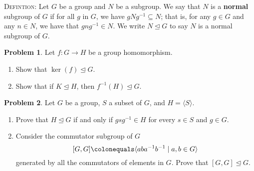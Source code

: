 \documentclass[11pt]{article}
\newcommand{\norm}{\trianglelefteq}
\theoremstyle{definition}
\newtheorem{problem}{Problem}
\begin{document}
\smallskip


\noindent \textsc{Defintion:} Let $G$ be a group and $N$ be a subgroup. We say that $N$ is a \textbf{normal} subgroup of $G$ if for all $g$ in $G$, we have $gNg^{-1} \subseteq N$; that is, for any $g\in G$ and any $n\in N$, we have that $gng^{-1}\in N$. We write $N \trianglelefteq G$ to say $N$ is a normal subgroup of $G$.

\begin{problem} Let $f: G\to H$ be a group homomorphism.
\begin{enumerate}[(4.1)]
\item Show that $\ker(f) \trianglelefteq G$.
\item Show that if $K \trianglelefteq H$, then $f^{-1}(H) \trianglelefteq G$.
\end{enumerate}
\end{problem}

\smallskip

\begin{problem}
Let $G$ be a group, $S$ a subset of $G$, and $H=\langle S \rangle$.  

\begin{enumerate}[(5.1)]
\item Prove that $H \norm G$ if and only if $gsg^{-1}\in H$ for every $s\in S$ and $g\in G$.

\item Consider the commutator subgroup of $G$
$$[G,G] \colonequals \langle aba^{-1}b^{-1}\mid a,b\in G \rangle$$ 
generated by all the commutators of elements in $G$.
Prove that $[G,G] \norm G$.


\end{enumerate}
\end{problem}
\end{document}
